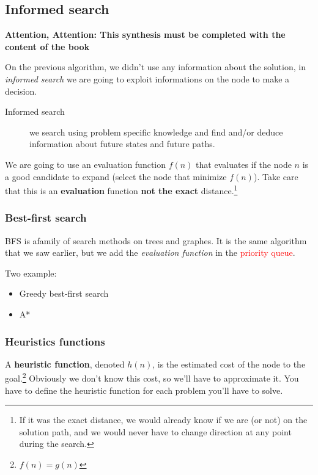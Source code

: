 \subsection{Informed search}

\textbf{Attention, Attention: This synthesis must be completed with the content of the book}

On the previous algorithm, we didn't use any information about the solution, in \textit{informed search} we are going to exploit informations on the node to make a decision.

\begin{description}
\item[Informed search] we search using problem specific knowledge and find and/or deduce information about future states and future paths.
\end{description}

We are going to use an evaluation function $f(n)$ that evaluates if the node $n$ is a good candidate to expand (select the node that minimize $f(n)$). Take care that this is an \textbf{evaluation} function \textbf{not the exact} distance.\footnote{If it was the exact distance, we would already know if we are (or not) on the solution path, and we would never have to change direction at any point during the search.}

\subsubsection{Best-first search}

BFS is afamily of search methods on trees and graphes. It is the same algorithm that we saw earlier, but we add the \textit{evaluation function} in the \textcolor{red}{priority queue}.

Two example:
\begin{itemize}
\item Greedy best-first search
\item A*
\end{itemize}

\subsubsection{Heuristics functions}

A \textbf{heuristic function}, denoted $h(n)$, is the estimated cost of the node to the goal.\footnote{$f(n)=g(n)$} Obviously we don't know this cost, so we'll have to approximate it. You have to define the heuristic function for each problem you'll have to solve. 


